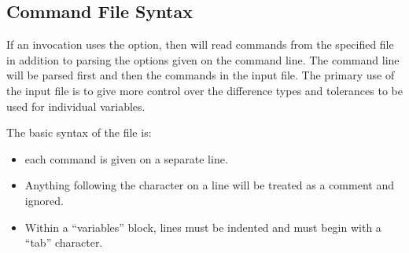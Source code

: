 \subsection{\exodiff{} Command File Syntax}\label{ed:command_file}

If an \exodiff{} invocation uses the  option,
then \exodiff{} will read commands from the specified file in addition
to parsing the options given on the command line.  The command line
will be parsed first and then the commands in the input file.  The
primary use of the input file is to give more control over the
difference types and tolerances to be used for individual variables.

The basic syntax of the file is:
\begin{itemize}

\item each command is given on a separate line.

\item Anything following the \param{\#} character on a line
will be treated as a comment and ignored. 

\item Within a ``variables'' block, lines must be indented and must begin with a ``tab'' character.
\end{itemize}

